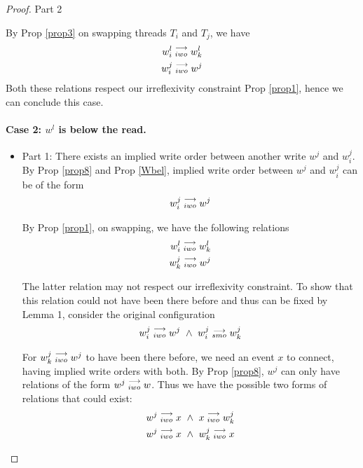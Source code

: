 \begin{proof}{Part 2}
\begin{itemize}
                        By Prop \ref{prop3} on swapping threads $T_i$ and $T_j$, we have 
                        \begin{align*}
                            w_i^l\stackrel{\longrightarrow}{_{iwo}}w_k^l \\ 
                            w_i^j\stackrel{\longrightarrow}{_{iwo}}w^j
                        \end{align*}
                        Both these relations respect our irreflexivity constraint Prop \ref{prop1}, hence we can conclude this case. 

                \end{itemize}

            \paragraph{Case 2: $w^l$ is below the read.}

                \begin{itemize}
                    \item Part 1: There exists an implied write order between another write $w^j$ and $w_i^j$.
                        By Prop \ref{prop8} and Prop \ref{Wbel}, implied write order between $w^j$ and $w_i^j$ can be of the form 
                        \begin{align*}
                            w_i^j\stackrel{\longrightarrow}{_{iwo}}w^j
                        \end{align*}

                        By Prop \ref{prop1}, on swapping, we have the following relations 
                        \begin{align*}
                            w_i^l\stackrel{\longrightarrow}{_{iwo}}w_k^l \\ 
                            w_k^j\stackrel{\longrightarrow}{_{iwo}}w^j
                        \end{align*}

                        The latter relation may not respect our irreflexivity constraint. To show that this relation could not have been there before and thus can be fixed by Lemma 1, consider the original configuration
                        \begin{align*}
                            \reln{w_i^j}{iwo}{w^j} \ \wedge \ \reln{w_i^j}{smo}{w_k^j}
                        \end{align*}

                        For $w_k^j\stackrel{\longrightarrow}{_{iwo}}w^j$ to have been there before, we need an event $x$ to connect, having implied write orders with both. By Prop \ref{prop8}, $w^j$ can only have relations of the form  $w^j\stackrel{\longrightarrow}{_{iwo}}w$. Thus we have the possible two forms of relations that could exist:
                        \begin{align*}
                            \reln{w^j}{iwo}{x} \ \wedge \ \reln{x}{iwo}{w_k^j} \\ 
                            \reln{w^j}{iwo}{x} \ \wedge \ \reln{w_k^j}{iwo}{x}
                        \end{align*}


\end{itemize}
\end{proof}
